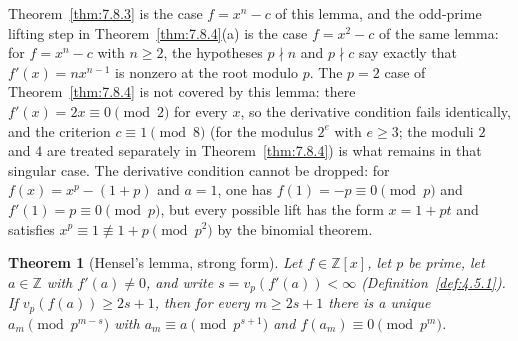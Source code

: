 \documentclass[11pt]{article}
\theoremstyle{ntstyle}
\newtheorem{theorem}{Theorem}[subsection]
\begin{document}
Theorem~\ref{thm:7.8.3} is the case $f=x^n-c$ of this lemma, and the
odd-prime lifting step in Theorem~\ref{thm:7.8.4}(a) is the case $f=x^2-c$ of the same lemma:
for $f=x^n-c$ with $n\ge2$, the hypotheses $p\nmid n$ and
$p\nmid c$ say exactly that $f'(x) = n x^{n-1}$ is nonzero at the root
modulo $p$. The $p = 2$ case of Theorem~\ref{thm:7.8.4} is not covered by this
lemma: there $f'(x) = 2x \equiv 0 \pmod{2}$ for every $x$, so the derivative
condition fails identically, and the criterion $c\equiv1\pmod{8}$ (for the modulus $2^e$ with $e\ge3$; the moduli
$2$ and $4$ are treated separately in Theorem~\ref{thm:7.8.4}) is what
remains in that singular case. The derivative condition cannot be
dropped: for $f(x)=x^p-(1+p)$ and $a=1$, one has
$f(1)=-p\equiv0\pmod{p}$ and $f'(1)=p\equiv0\pmod{p}$, but every possible
lift has the form $x=1+pt$ and satisfies $x^p\equiv1\not\equiv1+p\pmod{p^2}$ by
the binomial theorem.

\begin{theorem}[Hensel's lemma, strong form]\label{thm:11.4.2} Let $f\in\mathbb{Z}[x]$, let $p$
	be prime, let $a\in\mathbb{Z}$ with $f'(a)\neq0$, and write
	$s = v_p(f'(a))<\infty$ (Definition~\ref{def:4.5.1}). If $v_p(f(a))\ge2s + 1$, then for every $m\ge2s + 1$
	there is a unique $a_m\pmod{p^{m-s}}$ with $a_m\equiv a\pmod{p^{s+1}}$
	and $f(a_m)\equiv0\pmod{p^{m}}$.
\end{theorem}
\end{document}
